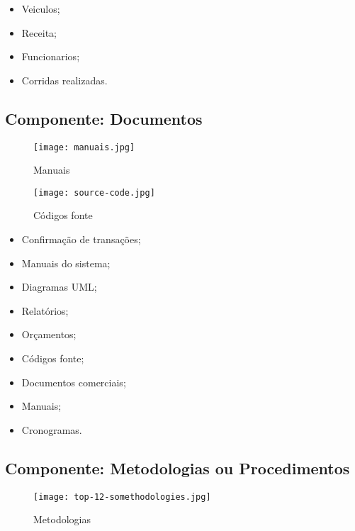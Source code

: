 \begin{itemize}

       \item Veiculos;
       \item Receita;
       \item Funcionarios;
       \item Corridas realizadas.
       \end{itemize}

\subsection{Componente: Documentos }

\begin{figure}[H]
       \begin{center}
              \texttt{[image: manuais.jpg]}
              \caption{Manuais} \label{sistema}
       \end{center}
\end{figure}

\begin{figure}[H]
       \begin{center}
              \texttt{[image: source-code.jpg]}
              \caption{Códigos fonte} \label{sistema}
       \end{center}
\end{figure}

\begin{itemize}
       \item Confirmação de transações;
       \item Manuais do sistema;
       \item Diagramas UML;
       \item Relatórios;
       \item Orçamentos;
       \item Códigos fonte;
       \item Documentos comerciais;
       \item Manuais;
       \item Cronogramas.
     \end{itemize}

\subsection{Componente: Metodologias ou Procedimentos}

\begin{figure}[H]
       \begin{center}
              \texttt{[image: top-12-somethodologies.jpg]}
              \caption{Metodologias} \label{sistema}
       \end{center}
\end{figure}

